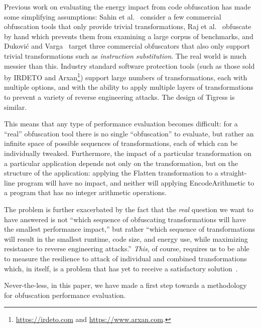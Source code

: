 Previous work on evaluating the energy impact from code obfuscation has made some simplifying assumptions: Sahin et al.~\cite{6976079} consider a few commercial obfuscation tools that only provide trivial transformations, Raj et al.~\cite{raj2017modelling} obfuscate by hand which prevents them from examining a large corpus of benchmarks, and Dukovi\'{c} and Varga~\cite{dhukovic2015load} target three commercial obfuscators that also only support trivial transformations such as {\em instruction substitution}. The real world is much messier than this. Industry standard software protection tools (such as those sold by IRDETO and Arxan\footnote{\url{https://irdeto.com} and \url{https://www.arxan.com}.}) support large numbers of transformations, each with multiple options, and with the ability to apply multiple layers of transformations to prevent a variety of reverse engineering attacks. 
The design of Tigress is similar. 

This means that any type of performance evaluation becomes difficult: for a ``real'' obfuscation tool there is no single ``obfuscation'' to evaluate, but rather an infinite space of possible sequences of transformations, each of which can be individually tweaked. Furthermore, the impact of a particular transformation on a particular application depends not only on the transformation, but on the structure of the application: applying the Flatten transformation to a straight-line program will have no impact, and neither will applying EncodeArithmetic to a program that has no integer arithmetic operations.

The problem is further exacerbated by the fact that the {\em real} question we want to have answered is not ``which sequence of obfuscating transformations will have the smallest performance impact,'' but rather ``which sequence of transformations will result in the smallest runtime, code size, and energy use, while maximizing resistance to reverse engineering attacks.'' {\em This}, of course, requires us to be able to measure the resilience to attack of individual and combined transformations which, in itself, is a problem that has yet to receive a satisfactory solution~\cite{banescu2017characterizing,wu2010framework}.

Never-the-less, in this paper, we have made a first step towards a methodology for obfuscation performance evaluation.